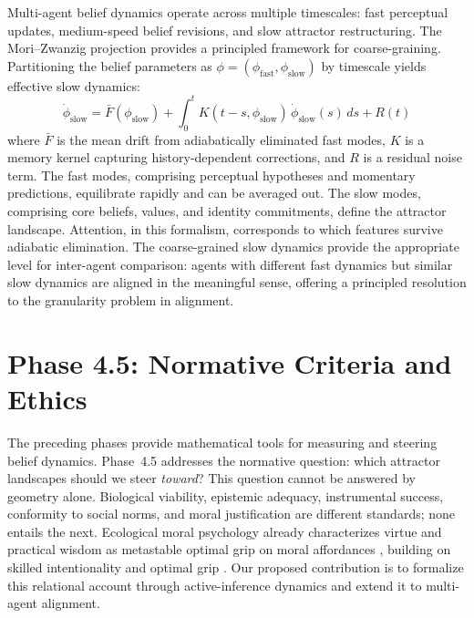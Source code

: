 \documentclass[11pt,a4paper]{article}
\theoremstyle{definition}
\begin{document}
Multi-agent belief dynamics operate across multiple timescales: fast perceptual updates, medium-speed belief revisions, and slow attractor restructuring. The Mori--Zwanzig projection \citep{zwanzig1961memory, mori1965transport} provides a principled framework for coarse-graining. Partitioning the belief parameters as $\phi = (\phi_{\mathrm{fast}}, \phi_{\mathrm{slow}})$ by timescale yields effective slow dynamics:
\begin{equation}
  \dot{\phi}_{\mathrm{slow}} = \bar{F}(\phi_{\mathrm{slow}}) + \int_0^t K(t-s, \phi_{\mathrm{slow}}) \, \dot{\phi}_{\mathrm{slow}}(s) \, ds + R(t)
  \label{eq:mori_zwanzig}
\end{equation}
where $\bar{F}$ is the mean drift from adiabatically eliminated fast modes, $K$ is a memory kernel capturing history-dependent corrections, and $R$ is a residual noise term. The fast modes, comprising perceptual hypotheses and momentary predictions, equilibrate rapidly and can be averaged out. The slow modes, comprising core beliefs, values, and identity commitments, define the attractor landscape. Attention, in this formalism, corresponds to which features survive adiabatic elimination. The coarse-grained slow dynamics provide the appropriate level for inter-agent comparison: agents with different fast dynamics but similar slow dynamics are aligned in the meaningful sense, offering a principled resolution to the granularity problem in alignment.


\section{Phase 4.5: Normative Criteria and Ethics}
\label{sec:phase4p5}

The preceding phases provide mathematical tools for measuring and steering belief dynamics. Phase~4.5 addresses the normative question: which attractor landscapes should we steer \emph{toward}? This question cannot be answered by geometry alone. Biological viability, epistemic adequacy, instrumental success, conformity to social norms, and moral justification are different standards; none entails the next. Ecological moral psychology already characterizes virtue and practical wisdom as metastable optimal grip on moral affordances \citep{jayawickreme2008ecological,hampson2021moral}, building on skilled intentionality and optimal grip \citep{bruineberg2014optimal,bruineberg2021metastable}. Our proposed contribution is to formalize this relational account through active-inference dynamics and extend it to multi-agent alignment.
\end{document}
